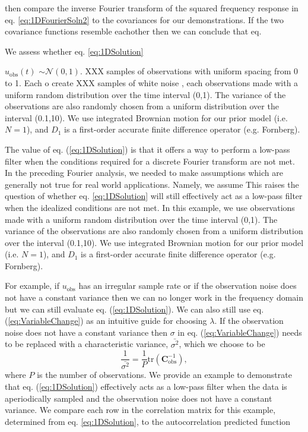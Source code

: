 \documentclass[10pt,a4paper]{article}
\begin{document}
then compare the inverse Fourier transform of the squared frequency response in eq. \ref{eq:1DFourierSoln2} to the covariances for our demonstrations.  If the two covariance functions resemble eachother then we can conclude that eq. 
    
We assess whether eq. \ref{eq:1DSolution}    

 $u_\mathrm{obs}(t)$  $\sim \mathcal{N}(0,1)$.  XXX samples of observations with uniform spacing from 0 to 1.  Each o      create XXX samples of white noise , each   observations made with a uniform random distribution over the time interval (0,1).  The variance of the observations are also randomly chosen from a uniform distribution over the interval (0.1,10).  We use integrated Brownian motion for our prior model (i.e. $N=1$), and $D_1$ is a first-order accurate finite difference operator (e.g. Fornberg).

The value of eq. (\ref{eq:1DSolution}) is that it offers a way to perform a low-pass filter when the conditions required for a discrete Fourier transform are not met.  In the preceding Fourier analysis, we needed to make assumptions which are generally not true for real world applications.  Namely, we assume  This raises the question of whether eq. \ref{eq:1DSolution} will still effectively act as a low-pass filter when the idealized conditions are not met.  In this example, we use  observations made with a uniform random distribution over the time interval (0,1).  The variance of the observations are also randomly chosen from a uniform distribution over the interval (0.1,10).  We use integrated Brownian motion for our prior model (i.e. $N=1$), and $D_1$ is a first-order accurate finite difference operator (e.g. Fornberg).

  For example, if $u_\mathrm{obs}$ has an irregular sample rate or if the observation noise does not have a constant variance then we can no longer work in the frequency domain but we can still evaluate eq. (\ref{eq:1DSolution}).  We can also still use eq. (\ref{eq:VariableChange}) as an intuitive guide for choosing $\lambda$.  If the  observation noise does not have a constant variance then $\sigma$ in eq. (\ref{eq:VariableChange}) needs to be replaced with a characteristic variance, $\bar{\sigma^2}$, which we choose to be
\begin{equation}\label{eq:CharacteristicVariance}
\frac{1}{\bar{\sigma^2}} = \frac{1}{P} \mathrm{tr}\left(\mathbf{C}_\mathrm{obs}^{-1}\right),
\end{equation}
where $P$ is the number of observations.  We provide an example to demonstrate that eq. (\ref{eq:1DSolution}) effectively acts as a low-pass filter when the data is aperiodically sampled and the observation noise does not have a constant variance.    We compare each row in the correlation matrix for this example, determined from eq. \ref{eq:1DSolution}, to the autocorrelation predicted function       
\end{document}

